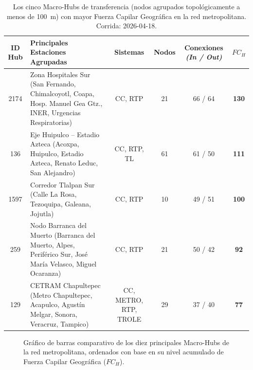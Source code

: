 \begin{table}[H]
    \centering
    \caption[Top 5 Macro-Hubs con mayor Fuerza Capilar Geográfica ($FC_H$)]{
    Los cinco Macro-Hubs de transferencia (nodos agrupados topológicamente a
    menos de 100~m) con mayor Fuerza Capilar Geográfica en la red metropolitana.
    Corrida: 2026-04-18.}
    \label{tab:fuerza-capilar-hubs}
    \fontsize{8.5pt}{10.5pt}\selectfont
    \begin{tabularx}{\textwidth}{|c|X|c|c|c|c|}
        \hline
        \textbf{ID Hub} & \textbf{Principales Estaciones Agrupadas} & \textbf{Sistemas} & \textbf{Nodos} & \textbf{Conexiones} \textit{(In / Out)} & \textbf{$FC_H$} \\
        \hline
        2174 & Zona Hospitales Sur (San Fernando, Chimalcoyotl, Coapa, Hosp. Manuel Gea Gtz., INER, Urgencias Respiratorias) & CC, RTP & 21 & 66 / 64 & \textbf{130} \\
        \hline
        136 & Eje Huipulco -- Estadio Azteca (Acoxpa, Huipulco, Estadio Azteca, Renato Leduc, San Alejandro) & CC, RTP, TL & 61 & 61 / 50 & \textbf{111} \\
        \hline
        1597 & Corredor Tlalpan Sur (Calle La Rosa, Tezoquipa, Galeana, Jojutla) & CC, RTP & 10 & 49 / 51 & \textbf{100} \\
        \hline
        259 & Nodo Barranca del Muerto (Barranca del Muerto, Alpes, Periférico Sur, José María Velasco, Miguel Ocaranza) & CC, RTP & 21 & 50 / 42 & \textbf{92} \\
        \hline
        129 & CETRAM Chapultepec (Metro Chapultepec, Acapulco, Agustín Melgar, Sonora, Veracruz, Tampico) & CC, METRO, RTP, TROLE & 29 & 37 / 40 & \textbf{77} \\
        \hline
    \end{tabularx}
    \vspace{1ex}
\end{table}

\begin{figure}[H]
    \centering
    \caption[Distribución de los principales Macro-Hubs por Fuerza Capilar]{
    Gráfico de barras comparativo de los diez principales Macro-Hubs de la red
    metropolitana, ordenados con base en su nivel acumulado de Fuerza Capilar
    Geográfica ($FC_H$).}
    \label{fig:barplot-macro-hubs}
\end{figure}

